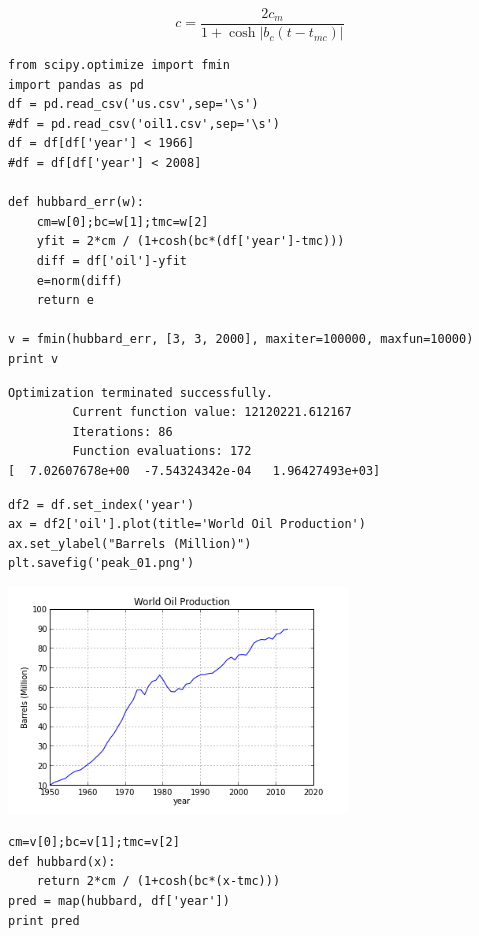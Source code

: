 \documentclass[12pt,fleqn]{article}\usepackage{../common}
\begin{document}
$$ 
c = \frac{ 2c_m}{1 + \cosh |b_c(t-t_{mc})|   }
$$


\begin{verbatim}
from scipy.optimize import fmin
import pandas as pd
df = pd.read_csv('us.csv',sep='\s')
#df = pd.read_csv('oil1.csv',sep='\s')
df = df[df['year'] < 1966]
#df = df[df['year'] < 2008]

def hubbard_err(w):
    cm=w[0];bc=w[1];tmc=w[2]
    yfit = 2*cm / (1+cosh(bc*(df['year']-tmc)))
    diff = df['oil']-yfit
    e=norm(diff)
    return e

v = fmin(hubbard_err, [3, 3, 2000], maxiter=100000, maxfun=10000)
print v
\end{verbatim}

\begin{verbatim}
Optimization terminated successfully.
         Current function value: 12120221.612167
         Iterations: 86
         Function evaluations: 172
[  7.02607678e+00  -7.54324342e-04   1.96427493e+03]
\end{verbatim}

\begin{verbatim}
df2 = df.set_index('year')
ax = df2['oil'].plot(title='World Oil Production')
ax.set_ylabel("Barrels (Million)")
plt.savefig('peak_01.png')
\end{verbatim}


\includegraphics[height=6cm]{peak_01.png}

\begin{verbatim}
cm=v[0];bc=v[1];tmc=v[2]
def hubbard(x): 
    return 2*cm / (1+cosh(bc*(x-tmc)))
pred = map(hubbard, df['year'])
print pred
\end{verbatim}
\end{document}
